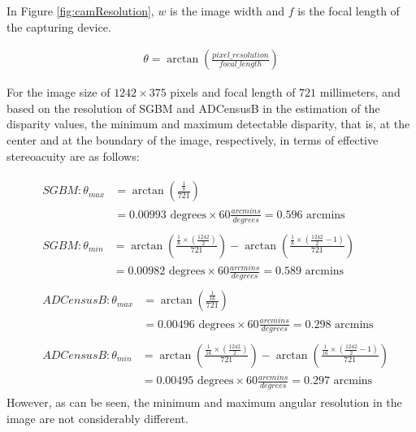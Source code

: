 \noindent
In Figure \ref{fig:camResolution}, $w$ is the image width and $f$ is the focal length of the capturing device.

\begin{align}
\label{eq:algResolution}
\theta = \arctan(\frac{pixel\_resolution}{focal\_length})
\end{align}

For the image size of $1242\times375$ pixels and focal length of $721$ millimeters, and based on the resolution of SGBM and ADCensusB in the estimation of the disparity values, 
the minimum and maximum detectable disparity, that is, at the center and at the boundary of the image, respectively, 
in terms of effective stereoacuity are as follows:

\begin{align}
\label{eq:algsgbmresolv} 
&\begin{aligned}
SGBM: \theta_{max} &= \arctan (\frac{\frac{1}{8}}{721}) \\
&= 0.00993 \text{ degrees} \times 60 \frac{arcmins}{degrees} = 0.596 \text{ arcmins}
\end{aligned}\\[2ex]
&\begin{aligned}
SGBM: \theta_{min} &= \arctan (\frac{\frac{1}{8}\times(\frac{1242}{2})}{721}) - \arctan (\frac{\frac{1}{8}\times(\frac{1242}{2}-1)}{721}) \\
&= 0.00982 \text{ degrees} \times 60 \frac{arcmins}{degrees} = 0.589 \text{ arcmins}
\end{aligned}\\[2ex]
&\begin{aligned}
ADCensusB: \theta_{max} &= \arctan (\frac{\frac{1}{16}}{721}) \\
&= 0.00496 \text{ degrees} \times 60 \frac{arcmins}{degrees}= 0.298 \text{ arcmins} 
\label{eq:adcenresolv}
\end{aligned}\\[2ex]
&\begin{aligned}
ADCensusB: \theta_{min} &= \arctan (\frac{\frac{1}{16}\times(\frac{1242}{2})}{721}) - \arctan (\frac{\frac{1}{16}\times(\frac{1242}{2}-1)}{721}) \\
&= 0.00495 \text{ degrees} \times 60 \frac{arcmins}{degrees}= 0.297 \text{ arcmins}
\end{aligned}
\end{align} \newline
\noindent
However, as can be seen, the minimum and maximum angular resolution in the image are not considerably different.

